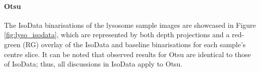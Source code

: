 \FloatBarrier
\paragraph{Otsu} The IsoData binarisations of the lysosome sample images are showcased in Figure \ref{fig:lyso_isodata}, which are represented by both depth projections and a red-green (RG) overlay of the IsoData and baseline binarisations for each sample's centre slice. It can be noted that observed results for Otsu are identical to those of IsoData; thus, all discussions in IsoData apply to Otsu.

\begin{figure}[h!]
	\centering
	

\end{figure}
